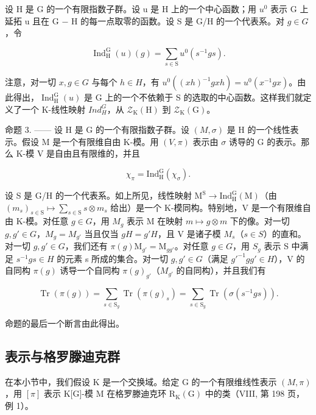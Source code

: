 设 H 是 G 的一个有限指数子群。设 u 是 H 上的一个中心函数；用 \(u^{0}\) 表示 G 上延拓 u 且在 G − H 的每一点取零的函数。设 S 是 G/H 的一个代表系。对 \(g \in G\)，令

\[
\operatorname{Ind} _ {\mathrm{H}} ^ {\mathrm{G}} (u) (g) = \sum_ {s \in \mathrm{S}} u ^ {0} (s ^ {- 1} g s).\tag{4}
\]

注意，对一切 \(x, g \in G\) 与每个 \(h \in H\)，有 \(u^{0}((xh)^{-1}gxh) = u^{0}(x^{-1}gx)\)。由此得出，\(\operatorname{Ind}_{\mathrm{H}}^{\mathrm{G}}(u)\) 是 G 上的一个不依赖于 S 的选取的中心函数。这样我们就定义了一个 K-线性映射 \(Ind_{H}^{G}\)，从 \(\mathcal{Z}_{\mathrm{K}}(\mathrm{H})\) 到 \(\mathcal{Z}_{\mathrm{K}}(\mathrm{G})\)。

命题 3. —— 设 H 是 G 的一个有限指数子群。设 \((M,\sigma)\) 是 H 的一个线性表示。假设 M 是一个有限维自由 K-模。用 \((V,\pi)\) 表示由 \(\sigma\) 诱导的 G 的表示。那么 K-模 V 是自由且有限维的，并且

\[
\chi_ {\pi} = \mathrm{Ind} _ {\mathrm{H}} ^ {\mathrm{G}} (\chi_ {\sigma}).\tag{5}
\]

设 S 是 G/H 的一个代表系。如上所见，线性映射 \(\mathrm{M}^{\mathrm{S}}\to\mathrm{Ind}_{\mathrm{H}}^{\mathrm{G}}(\mathrm{M})\)（由 \((m_{s})_{s\in\mathrm{S}}\mapsto\sum_{s\in\mathrm{S}}s\otimes m_{s}\) 给出）是一个 K-模同构。特别地，V 是一个有限维自由 K-模。对任意 \(g\in G\)，用 \(M_{g}\) 表示 M 在映射 \(m\mapsto g\otimes m\) 下的像。对一切 \(g,g'\in G\)，\(M_{g}=M_{g'}\) 当且仅当 \(gH=g'H\)，且 V 是诸子模 \(M_{s}\)（\(s\in S\)）的直和。对一切 \(g,g'\in G\)，我们还有 \(\pi(g)\mathrm{M}_{g'}=\mathrm{M}_{gg'}\)。对任意 \(g\in G\)，用 \(S_{g}\) 表示 S 中满足 \(s^{-1}gs\in H\) 的元素 s 所成的集合。对一切 \(g,g'\in G\)（满足 \(g'^{-1}gg'\in H\)），V 的自同构 \(\pi(g)\) 诱导一个自同构 \(\pi(g)_{g'}\)（\(M_{g'}\) 的自同构），并且我们有

\[
\operatorname{Tr} (\pi (g)) = \sum_ {s \in \mathrm{S} _ {g}} \operatorname{Tr} (\pi (g) _ {s}) = \sum_ {s \in \mathrm{S} _ {g}} \operatorname{Tr} (\sigma (s ^ {- 1} g s)).
\]

命题的最后一个断言由此得出。

\subsection{表示与格罗滕迪克群}

在本小节中，我们假设 K 是一个交换域。给定 G 的一个有限维线性表示 \((M,\pi)\)，用 \([\pi]\) 表示 K{[}G{]}-模 M 在格罗滕迪克环 \(\mathrm{R}_{\mathrm{K}}(\mathrm{G})\) 中的类（VIII, 第 198 页，例 1）。

